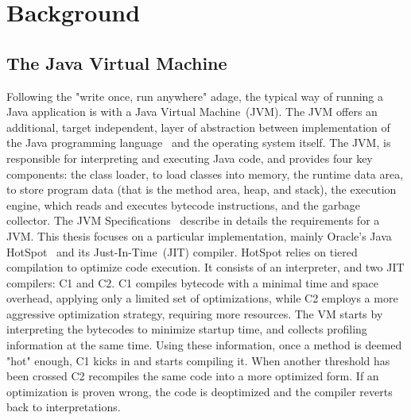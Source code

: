 \chapter{Background}


\section{The Java Virtual Machine}
Following the "write once, run anywhere" adage, the typical way of running a Java application is with a Java Virtual Machine~(JVM).
The JVM offers an additional, target independent, layer of abstraction between implementation of 
the Java programming language~\cite{noauthor_java_nodate-2} and the operating system itself.
The JVM, is responsible for interpreting and executing Java code, and provides four key components: 
the class loader, to load classes into memory, the runtime data area, to store program data (that is the method area, heap, and stack), the execution engine, which reads and executes bytecode instructions, and the garbage collector. The JVM Specifications~\cite{noauthor_java_nodate-1} describe in details the requirements for a JVM. 
This thesis focuses on a particular implementation, mainly Oracle's Java HotSpot~\cite{noauthor_hotspot_nodate} and its Just-In-Time~(JIT) compiler. 
HotSpot relies on tiered compilation to optimize code execution. It consists of an interpreter, and two JIT compilers: C1 and C2. 
C1 compiles bytecode with a minimal time and space overhead, applying only a limited set of optimizations, while C2 employs a more aggressive optimization strategy, requiring more resources.
The VM starts by interpreting the bytecodes to minimize startup time, and collects profiling information at the same time. Using these information, once a method is deemed "hot" enough, C1 kicks in and starts compiling it. When another threshold has been crossed C2 
recompiles the same code into a more optimized form. If an optimization is proven wrong, the code is 
deoptimized and the compiler reverts back to interpretations.  


